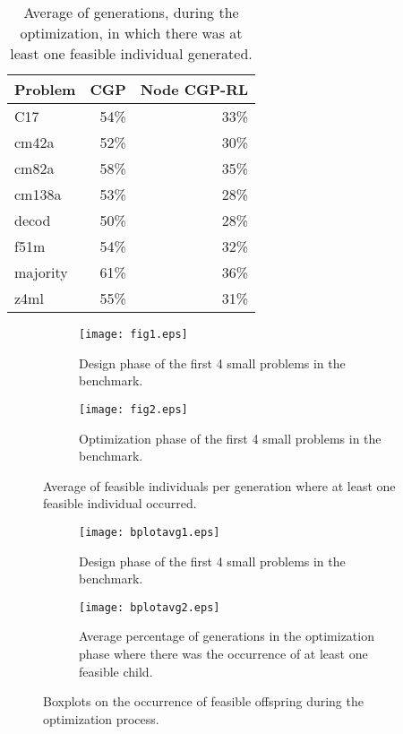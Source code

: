 \begin{table}[tb]
\caption{Average of generations, during the optimization, in which there was at least one feasible individual generated.}
    \label{tab:fac}
    \centering
    \begin{tabular}{lrr}
\toprule
     Problem &  CGP & Node CGP-RL \\
\midrule
  C17 & 54\% & 33\% \\
  cm42a & 52\% & 30\% \\
  cm82a & 58\% & 35\% \\
  cm138a & 53\% & 28\% \\
  decod & 50\% & 28\% \\
  f51m & 54\% & 32\% \\
  majority & 61\% & 36\%\\
  z4ml & 55\% & 31\% \\
\bottomrule
\end{tabular}
    
\end{table}

\begin{figure}
\centering
  \begin{subfigure}[t]{0.8\textwidth}
    \texttt{[image: fig1.eps]}
    \caption{Design phase of the first 4 small problems in the benchmark.} \label{fig:4a}
  \end{subfigure}%
  \par
  \begin{subfigure}[c]{0.8\textwidth}
    \texttt{[image: fig2.eps]}
    \caption{Optimization phase of the first 4 small problems in the benchmark.} \label{fig:4b}
  \end{subfigure}%
\caption{Average of feasible individuals per generation where at least one feasible individual occurred.} \label{fig:4}
\end{figure}


\begin{figure}
\centering
  \begin{subfigure}[t]{0.8\textwidth}
    \texttt{[image: bplotavg1.eps]}
    \caption{Design phase of the first 4 small problems in the benchmark.} \label{fig:facpop}
  \end{subfigure}%
  \par
  \begin{subfigure}[c]{0.8\textwidth}
    \texttt{[image: bplotavg2.eps]}
    \caption{Average percentage of generations in the optimization phase where there was the occurrence of at least one feasible child.} \label{fig:4b}
  \end{subfigure}%
\caption{Boxplots on the occurrence of feasible offspring during the optimization process.} \label{fig:facgen}
\end{figure}
